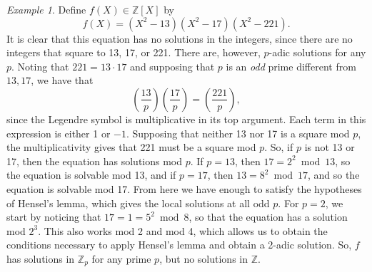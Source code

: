 \documentclass[12pt,twoside]{reedthesis}
\theoremstyle{plain}
\theoremstyle{definition}
\theoremstyle{remark}
\newtheorem{example}{Example}[section]
\newcommand{\ZZ}{\mathbb{Z}}
\begin{document}
\begin{example}
Define $f(X)\in\ZZ[X]$ by \[f(X)=(X^2-13)(X^2-17)(X^2-221).\] It is clear that this equation has no solutions in the integers, since there are no integers that square to 13, 17, or 221. There are, however, $p$-adic solutions for any $p$. Noting that $221=13\cdot 17$ and supposing that $p$ is an \emph{odd} prime different from $13,17$, we have that \[\left(\frac{13}{p}\right)\left(\frac{17}{p}\right)=\left(\frac{221}{p}\right),\] since the Legendre symbol is multiplicative in its top argument. Each term in this expression is either 1 or $-1$. Supposing that neither 13 nor 17 is a square mod $p$, the multiplicativity gives that 221 must be a square mod $p$. So, if $p$ is not 13 or 17, then the equation has solutions mod $p$. If $p=13$, then $17=2^2\bmod13$, so the equation is solvable mod 13, and if $p=17$, then $13=8^2\bmod17$, and so the equation is solvable mod 17. From here we have enough to satisfy the hypotheses of Hensel's lemma, which gives the local solutions at all odd $p$. For $p=2$, we start by noticing that $17=1=5^2\bmod 8$, so that the equation has a solution mod $2^3$. This also works mod 2 and mod 4, which allows us to obtain the conditions necessary to apply Hensel's lemma and obtain a 2-adic solution. So, $f$ has solutions in $\ZZ_p$ for any prime $p$, but no solutions in $\ZZ$.
\end{example}
\end{document}
